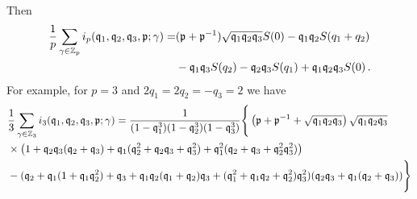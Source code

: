 \documentclass[main.tex]{subfiles}
\begin{document}
\begin{comment}
\end{equation}
Collecting everything we arrive at
\begin{equation}
\begin{aligned}
&S(b_1,b_2)=\frac{1}{(1-\qbf_1\qbf_2\qbf_3)}\left\{\frac{\qbf_1^{[[b_1]]_{p/q_1}}\qbf_2^{[[b_2]]_{p/q_2}}}{\left(1-\qbf_1^{p/q_1}\right)\left(1-\qbf_2^{p/q_2}\right)}+\frac{\qbf_2^{p/q_1+[[b_2]]_{p/q_2}-[[b_1]]_{p/q_1}}\qbf_3^{p/q_1-[[b_1]]_{p/q_1}}}{\left(1-\qbf_2^{p/q_2}\right)\left(1-\qbf_2^{p/q_1}\qbf_3^{p/q_1}\right)}\right.\\
&\left.+\frac{\qbf_1^{p/q_2+[[b_1]]_{p/q_1}-[[b_2]]_{p/q_2}}\qbf_3^{p/q_2-[[b_2]]_{p/q_2}}}{\left(1-\qbf_1^{p/q_1}\right)\left(1-\qbf_1^{p/q_2}\qbf_3^{p/q_2}\right)}+\frac{\qbf_3^{p/q_1-[[b_1]]_{p/q_1}}}{\left(1-\qbf_1\qbf_3\right)\left(1-\qbf_3^{p/q_1}\right)}+\frac{\qbf_2\qbf_3^{p/q_2-[[b_2]]_{p/q_2}+1}}{\left(1-\qbf_2\qbf_3\right)\left(1-\qbf_3^{p/q_2}\right)}\right\}\,.
\end{aligned}
\end{equation}
The function has the correct symmetry properties, namely that it is symmetric under the exchange $\qbf_1\leftrightarrow\qbf_2$ only when $q_1=q_2$ (and $b_1=b_2$) and it is never symmetric under $\qbf_3\leftrightarrow\qbf_1$ or $\qbf_3\leftrightarrow\qbf_2$ for $p>1$. Then 
Of course when $p=1$ we obtain the expression \eqref{eqn:freetensorsing} evaluated at $\gamma=1$.
\end{comment}
Then
\begin{equation}
\begin{aligned}
\frac{1}{p}\sum_{\gamma\in\mathbb{Z}_p}i_p(\mathfrak{q}_1,\mathfrak{q}_2,\mathfrak{q}_3,\mathfrak{p};\gamma)=&(\mathfrak{p}+\mathfrak{p}^{-1})\sqrt{\mathfrak{q}_1\mathfrak{q}_2\mathfrak{q}_3}S(0)-\mathfrak{q}_1\mathfrak{q}_2S(q_1+q_2)\\&-\mathfrak{q}_1\mathfrak{q}_3S(q_2)-\mathfrak{q}_2\mathfrak{q}_3S(q_1)+\mathfrak{q}_1\mathfrak{q}_2\mathfrak{q}_3S(0)\,.
\end{aligned}
\end{equation}
For example, for $p=3$ and $2q_1=2q_2=-q_3=2$ we have
\begin{equation}
\begin{aligned}
&\frac{1}{3}\sum_{\gamma\in\mathbb{Z}_3}i_3(\mathfrak{q}_1,\mathfrak{q}_2,\mathfrak{q}_3,\mathfrak{p};\gamma)=\frac{1}{(1-\mathfrak{q}_1^3)(1-\mathfrak{q}_2^3)(1-\mathfrak{q}_3^3)}\Bigg\{\left(\mathfrak{p}+\mathfrak{p}^{-1}+\sqrt{\mathfrak{q}_1\mathfrak{q}_2\mathfrak{q}_3}\right)\sqrt{\mathfrak{q}_1\mathfrak{q}_2\mathfrak{q}_3}\\
&\times\left(1 + \mathfrak{q}_2 \mathfrak{q}_3 (\mathfrak{q}_2 + \mathfrak{q}_3) + \mathfrak{q}_1 (\mathfrak{q}_2^2 + \mathfrak{q}_2 \mathfrak{q}_3 + \mathfrak{q}_3^2) + \mathfrak{q}_1^2 (\mathfrak{q}_2 + \mathfrak{q}_3 + \mathfrak{q}_2^2 \mathfrak{q}_3^2)\right)\\
&-(\mathfrak{q}_2 + \mathfrak{q}_1 (1 + \mathfrak{q}_1 \mathfrak{q}_2^2) + \mathfrak{q}_3 + 
    \mathfrak{q}_1 \mathfrak{q}_2 (\mathfrak{q}_1 + \mathfrak{q}_2) \mathfrak{q}_3 + (\mathfrak{q}_1^2 + \mathfrak{q}_1 \mathfrak{q}_2 + \mathfrak{q}_2^2) \mathfrak{q}_3^2) (\mathfrak{q}_2 \mathfrak{q}_3 + 
   \mathfrak{q}_1 (\mathfrak{q}_2 + \mathfrak{q}_3))\Bigg\}
\end{aligned}
\end{equation}
\end{document}
